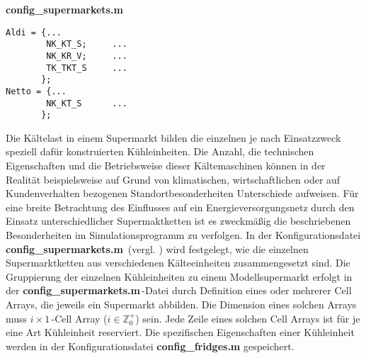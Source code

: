 \vspace{3mm}
\noindent\textbf{config\_supermarkets.m}
\vspace{3mm}


\begin{lstlisting}[float=h!,caption=config\_supermarkets.m,label={csuper}]
%%       Kind of fridge
Aldi = {...
        NK_KT_S;     ...
        NK_KR_V;     ...
        TK_TKT_S     ...
       };
Netto = {...
        NK_KT_S      ...
       };
\end{lstlisting}

Die Kältelast in einem Supermarkt bilden die einzelnen je nach Einsatzzweck speziell dafür konstruierten Kühleinheiten. Die
Anzahl, die technischen Eigenschaften und die Betriebsweise dieser Kältemaschinen können in der Realität beispielsweise auf
Grund von klimatischen, wirtschaftlichen oder auf Kundenverhalten bezogenen Standortbesonderheiten Unterschiede
aufweisen. Für eine breite Betrachtung des Einflusses auf ein Energieversorgungsnetz durch
den Einsatz unterschiedlicher Supermaktketten ist es zweckmäßig die beschriebenen Besonderheiten im Simulationsprogramm zu
verfolgen. In der Konfigurationsdatei \textbf{config\_supermarkets.m$\,$} (vergl. ) wird festgelegt, wie die
einzelnen Supermarktketten aus verschiedenen Kälteeinheiten zusammengesetzt sind. Die Gruppierung der einzelnen Kühleinheiten
zu einem Modellsupermarkt erfolgt in der \textbf{config\_supermarkets.m$\,$}-Datei durch Definition eines oder mehrerer Cell
Arrays, die jeweils ein Supermarkt abbilden. Die Dimension eines solchen Arrays muss $i\times1\,$-Cell Array ($i\in
\mathbb{Z}^+_0$) sein. Jede Zeile eines solchen Cell
Arrays ist für je eine Art Kühleinheit reserviert. Die spezifischen Eigenschaften einer Kühleinheit werden in der
Konfigurationsdatei \textbf{config\_fridges.m} gespeichert.

